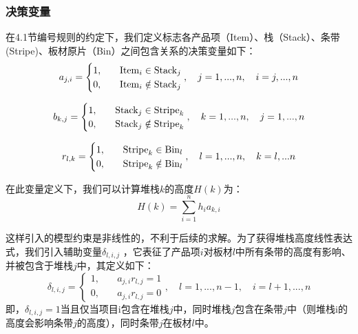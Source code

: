 \documentclass[bwprint]{gmcmthesis}
\begin{document}
\subsubsection{决策变量}
在4.1节编号规则的约定下，我们定义标志各产品项（Item）、栈（Stack）、条带(Stripe)、板材原片（Bin）之间包含关系的决策变量如下：
\begin{equation}   %
    a_{j,i}=
    \begin{cases}
        1, \quad  &  {\rm Item}_i \in   {\rm Stack}_j \\
        0,\quad  &  {\rm Item}_i  \notin   {\rm Stack}_j \\
    \end{cases},\quad j=1,...,n, \quad i=j,...,n  \label{决策变量定义a}
\end{equation}

\begin{equation}
    b_{k,j}=
    \begin{cases}
        1, \quad  &  {\rm Stack}_j \in   {\rm Stripe}_k \\
        0,\quad  &  {\rm Stack}_j  \notin   {\rm Stripe}_k \\
    \end{cases},\quad k=1,...,n, \quad j=1,...,n \label{决策变量定义b}
\end{equation}

\begin{equation}
    r_{l,k}=
    \begin{cases}
        1, \quad  &  {\rm Stripe}_k \in   {\rm Bin}_l \\
        0,\quad  &  {\rm Stripe}_k  \notin   {\rm Bin}_l \\
    \end{cases},\quad l=1,...,n, \quad k=l,...n \label{决策变量定义r}
\end{equation}

在此变量定义下，我们可以计算堆栈$k$的高度$H(k)$为：
\begin{equation}
    H(k)=\sum_{i=1}^{n} h_i a_{k,i}
\end{equation}


这样引入的模型约束是非线性的，不利于后续的求解。为了获得堆栈高度线性表达式，我们引入辅助变量$\delta_{l,i,j}$ ，它表征了产品项$i$对板材$l$中所有条带的高度有影响、并被包含于堆栈$j$中，其定义如下：
\begin{equation}
    \delta_{l,i,j}=  
    \begin{cases}
        1, \quad  & a_{j,i} r_{l,j}=1\\
        0, \quad  & a_{j,i} r_{l,j}=0
    \end{cases},\quad l=1,...,n-1, \quad i=l+1,...,n
\end{equation}
即，$\delta_{l,i,j} = 1$当且仅当项目i包含在堆栈$j$中，同时堆栈$j$包含在条带$j$中（则堆栈i的高度会影响条带$j$的高度），同时条带$j$在板材$l$中。
\end{document}
